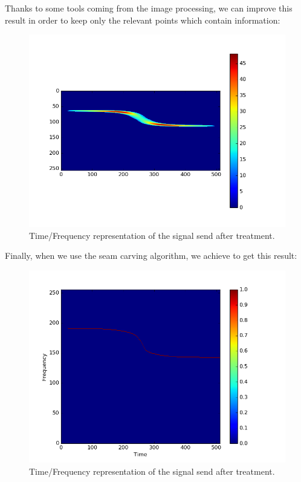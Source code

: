 Thanks to some tools coming from the image processing, we can improve this result in order to keep only the relevant points which contain information:

\begin{figure}[H]
\centering
    \includegraphics[scale=0.6,angle=0]{Images/varseuil_signal.png}
    \caption{Time/Frequency representation of the signal send after treatment.}
    \label{fig:varseuil_signal}
\end{figure}

Finally, when we use the seam carving algorithm, we achieve to get this result:

\begin{figure}[H]
\centering
    \includegraphics[scale=0.6,angle=0]{Images/doopler_signal_esti.png}
    \caption{Time/Frequency representation of the signal send after treatment.}
    \label{fig:doopler_signal_spec}
\end{figure}

